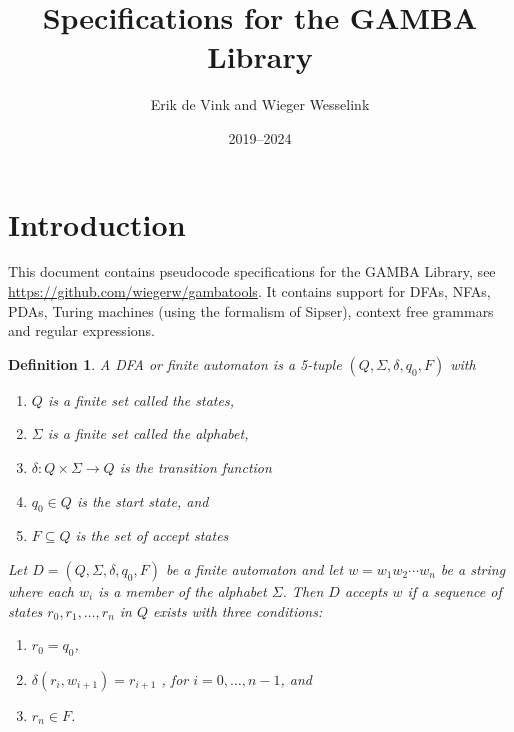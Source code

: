 \documentclass[11pt]{article}
\title{Specifications for the GAMBA Library}
\author{Erik de Vink and Wieger Wesselink}
\date{2019--2024}
\newtheorem{definition}{Definition}
\begin{document}
\maketitle

\section{Introduction}
This document contains pseudocode specifications for the GAMBA Library, see \url{https://github.com/wiegerw/gambatools}. It contains support for DFAs, NFAs, PDAs, Turing machines (using the formalism of Sipser), context free grammars and regular expressions.

\begin{definition}
A DFA or finite automaton is a 5-tuple $(Q, \Sigma, \delta, q_0, F)$ with
\begin{enumerate}
    \item $Q$ is a finite set called the states,
    \item $\Sigma$ is a finite set called the alphabet,
    \item $\delta: Q \times \Sigma \rightarrow Q$ is the transition function
    \item $q_0 \in Q$ is the start state, and
    \item $F \subseteq Q$ is the set of accept states
\end{enumerate}
Let $D = (Q, \Sigma, \delta, q_0, F)$ be a finite automaton and let $w = w_1 w_2 \cdots w_n$ be a string where each $w_i$ is a member of the alphabet $\Sigma$. Then $D$ accepts $w$ if a
sequence of states $r_0, r_1, \ldots, r_n$ in $Q$ exists with three conditions:
\begin{enumerate}
    \item $r_0 = q_0$,
    \item $\delta(r_i, w_{i+1}) = r_{i+1}$ , for $i = 0, \ldots, n - 1$, and
    \item $r_n \in F$.
\end{enumerate}
\end{definition}
\end{document}
